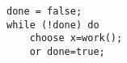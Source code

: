 \begin{lstlisting}
done = false;
while (!done) do
    choose x=work();
    or done=true;
\end{lstlisting}
